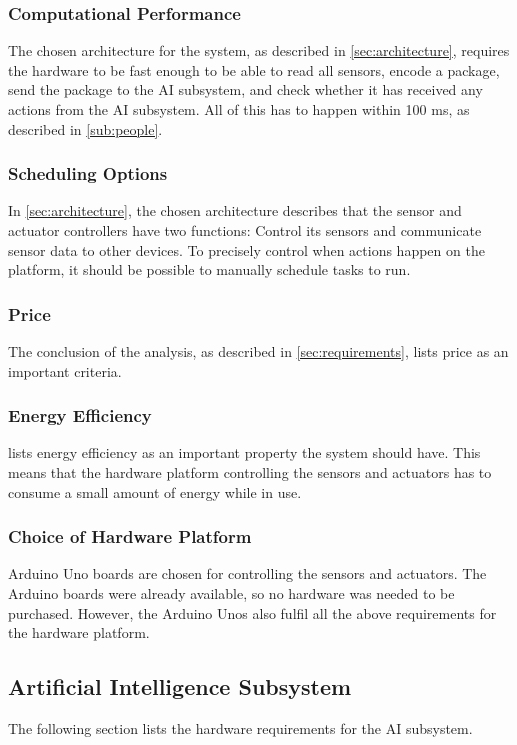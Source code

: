 \subsubsection{Computational Performance}
The chosen architecture for the system, as described in \cref{sec:architecture}, requires the hardware to be fast enough to be able to read all sensors, encode a package, send the package to the AI subsystem, and check whether it has received any actions from the AI subsystem. All of this has to happen within 100 ms, as described in \cref{sub:people}.

\subsubsection{Scheduling Options}
In \cref{sec:architecture}, the chosen architecture describes that the sensor and actuator controllers have two functions: Control its sensors and communicate sensor data to other devices. To precisely control when actions happen on the platform, it should be possible to manually schedule tasks to run.

\subsubsection{Price}
The conclusion of the analysis, as described in \cref{sec:requirements}, lists price as an important criteria.

\subsubsection{Energy Efficiency}
 lists energy efficiency as an important property the system should have. This means that the hardware platform controlling the sensors and actuators has to consume a small amount of energy while in use.

\subsubsection{Choice of Hardware Platform}
Arduino Uno boards are chosen for controlling the sensors and actuators. The Arduino boards were already available, so no hardware was needed to be purchased. However, the Arduino Unos also fulfil all the above requirements for the hardware platform.

\subsection{Artificial Intelligence Subsystem}
The following section lists the hardware requirements for the AI subsystem.

